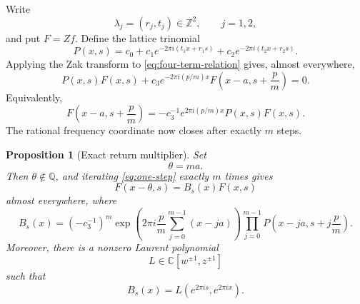 \documentclass[reqno]{amsart}
\newtheorem{proposition}[theorem]{Proposition}
\theoremstyle{remark}
\numberwithin{equation}{section}
\newcommand{\Q}{\mathbb{Q}}
\newcommand{\Z}{\mathbb{Z}}
\newcommand{\C}{\mathbb{C}}
\begin{document}
Write
\[
  \lambda_j=(r_j,t_j)\in\Z^2,
  \qquad j=1,2,
\]
and put \(F=Zf\). Define the lattice trinomial
\begin{equation}
  P(x,s)
  =c_0+c_1e^{-2\pi i(t_1x+r_1s)}
       +c_2e^{-2\pi i(t_2x+r_2s)}.
  \label{eq:P-def}
\end{equation}
Applying the Zak transform to \eqref{eq:four-term-relation} gives, almost
everywhere,
\begin{equation}
  P(x,s)F(x,s)
  +c_3e^{-2\pi i(p/m)x}
   F\left(x-a,s+\frac{p}{m}\right)=0.
  \label{eq:zak-fibre}
\end{equation}
Equivalently,
\begin{equation}
  F\left(x-a,s+\frac{p}{m}\right)
  =-c_3^{-1}e^{2\pi i(p/m)x}P(x,s)F(x,s).
  \label{eq:one-step}
\end{equation}
The rational frequency coordinate now closes after exactly \(m\) steps.

\begin{proposition}[Exact return multiplier]
\label{prop:return}
Set
\[
  \theta=ma.
\]
Then \(\theta\notin\Q\), and iterating \eqref{eq:one-step} exactly \(m\)
times gives
\begin{equation}
  F(x-\theta,s)=B_s(x)F(x,s)
  \label{eq:return}
\end{equation}
almost everywhere, where
\begin{equation}
  B_s(x)
  =(-c_3^{-1})^m
   \exp\left(
      2\pi i\frac{p}{m}\sum_{j=0}^{m-1}(x-ja)
   \right)
   \prod_{j=0}^{m-1}
     P\left(x-ja,s+j\frac{p}{m}\right).
  \label{eq:B-def}
\end{equation}
Moreover, there is a nonzero Laurent polynomial
\[
  L\in\C[w^{\pm1},z^{\pm1}]
\]
such that
\begin{equation}
  B_s(x)=L(e^{2\pi i s},e^{2\pi i x}).
  \label{eq:Laurent-return}
\end{equation}
\end{proposition}
\end{document}
